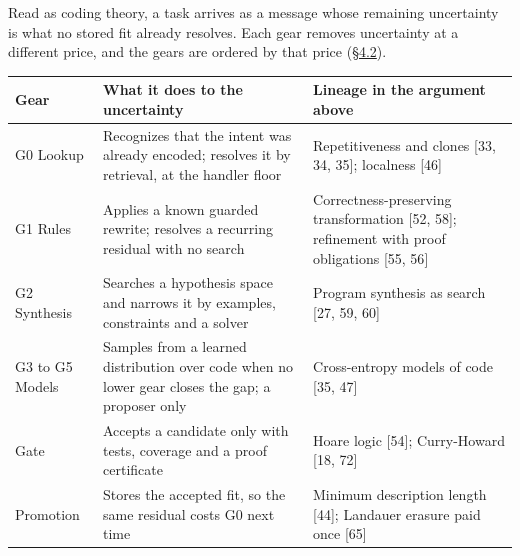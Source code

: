 \documentclass[10pt,letterpaper]{article}
\newcounter{none}
\begin{document}
Read as coding theory, a task arrives as a message whose remaining
uncertainty is what no stored fit already resolves. Each gear removes
uncertainty at a different price, and the gears are ordered by that
price
(\href{https://research.openie.dev/papers/rce/\#42-the-gears}{§4.2}).

{\def\LTcaptype{none} %
{\footnotesize\setlength{\tabcolsep}{3.8pt}\renewcommand{\arraystretch}{1.15}
\begin{longtable}[]{@{}
  >{\raggedright\arraybackslash}p{}
  >{\raggedright\arraybackslash}p{}
  >{\raggedright\arraybackslash}p{}@{}}
\toprule\noalign{}
\begin{minipage}[b]{\linewidth}\raggedright
\textbf{Gear}
\end{minipage} & \begin{minipage}[b]{\linewidth}\raggedright
\textbf{What it does to the uncertainty}
\end{minipage} & \begin{minipage}[b]{\linewidth}\raggedright
\textbf{Lineage in the argument above}
\end{minipage} \\
\midrule\noalign{}
\endhead
\bottomrule\noalign{}
\endlastfoot
G0 Lookup & Recognizes that the intent was already encoded; resolves it
by retrieval, at the handler floor & Repetitiveness and clones {[}33,
34, 35{]}; localness {[}46{]} \\
G1 Rules & Applies a known guarded rewrite; resolves a recurring
residual with no search & Correctness-preserving transformation {[}52,
58{]}; refinement with proof obligations {[}55, 56{]} \\
G2 Synthesis & Searches a hypothesis space and narrows it by examples,
constraints and a solver & Program synthesis as search {[}27, 59,
60{]} \\
G3 to G5 Models & Samples from a learned distribution over code when no
lower gear closes the gap; a proposer only & Cross-entropy models of
code {[}35, 47{]} \\
Gate & Accepts a candidate only with tests, coverage and a proof
certificate & Hoare logic {[}54{]}; Curry-Howard {[}18, 72{]} \\
Promotion & Stores the accepted fit, so the same residual costs G0 next
time & Minimum description length {[}44{]}; Landauer erasure paid once
{[}65{]} \\
\end{longtable}
}
}
\end{document}
